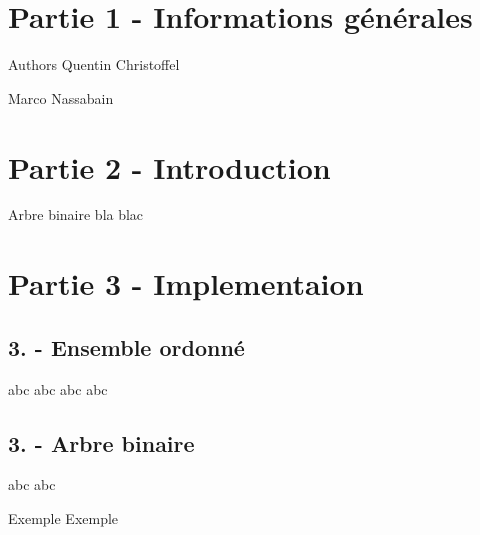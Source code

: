 \hypertarget{index_Infos}{}\section{Partie 1 -\/ Informations générales}\label{index_Infos}
\begin{DoxyAuthor}{Authors}
Quentin Christoffel 

Marco Nassabain
\end{DoxyAuthor}
\hypertarget{index_Introduction}{}\section{Partie 2 -\/ Introduction}\label{index_Introduction}
Arbre binaire bla blac\hypertarget{index_Implementation}{}\section{Partie 3 -\/ Implementaion}\label{index_Implementation}
\hypertarget{index_Ensemble}{}\subsection{3. -\/ Ensemble ordonné}\label{index_Ensemble}
abc abc abc abc\hypertarget{index_Arbre}{}\subsection{3. -\/ Arbre binaire}\label{index_Arbre}
abc abc

Exemple Exemple 